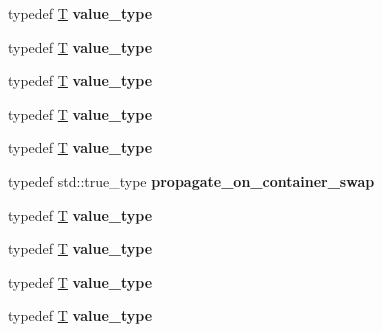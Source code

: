 \begin{DoxyCompactItemize}
\item 
\mbox{\label{structsome__alloc_a41022544a2b3ffeb4ffce92f759eb30b}} 
typedef \mbox{\hyperlink{struct_t}{T}} {\bfseries value\+\_\+type}
\item 
\mbox{\label{structsome__alloc_a41022544a2b3ffeb4ffce92f759eb30b}} 
typedef \mbox{\hyperlink{struct_t}{T}} {\bfseries value\+\_\+type}
\item 
\mbox{\label{structsome__alloc_a41022544a2b3ffeb4ffce92f759eb30b}} 
typedef \mbox{\hyperlink{struct_t}{T}} {\bfseries value\+\_\+type}
\item 
\mbox{\label{structsome__alloc_a41022544a2b3ffeb4ffce92f759eb30b}} 
typedef \mbox{\hyperlink{struct_t}{T}} {\bfseries value\+\_\+type}
\item 
\mbox{\label{structsome__alloc_a41022544a2b3ffeb4ffce92f759eb30b}} 
typedef \mbox{\hyperlink{struct_t}{T}} {\bfseries value\+\_\+type}
\item 
\mbox{\label{structsome__alloc_aad61c49c6ad5f1ca6dfb3f5d38d70d57}} 
typedef std\+::true\+\_\+type {\bfseries propagate\+\_\+on\+\_\+container\+\_\+swap}
\item 
\mbox{\label{structsome__alloc_a41022544a2b3ffeb4ffce92f759eb30b}} 
typedef \mbox{\hyperlink{struct_t}{T}} {\bfseries value\+\_\+type}
\item 
\mbox{\label{structsome__alloc_a41022544a2b3ffeb4ffce92f759eb30b}} 
typedef \mbox{\hyperlink{struct_t}{T}} {\bfseries value\+\_\+type}
\item 
\mbox{\label{structsome__alloc_a41022544a2b3ffeb4ffce92f759eb30b}} 
typedef \mbox{\hyperlink{struct_t}{T}} {\bfseries value\+\_\+type}
\item 
\mbox{\label{structsome__alloc_a41022544a2b3ffeb4ffce92f759eb30b}} 
typedef \mbox{\hyperlink{struct_t}{T}} {\bfseries value\+\_\+type}
\item 
\mbox{\label{structsome__alloc_a41022544a2b3ffeb4ffce92f759eb30b}} 

\end{DoxyCompactItemize}
